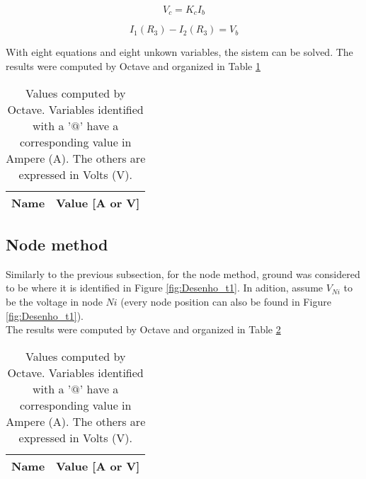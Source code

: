 \begin{equation}
	V_c = K_cI_b
	\label{eq:depsrc2}
\end{equation}

\begin{equation}
	I_1(R_3)-I_2(R_3) = V_b
	\label{eq:rel_ohm1}
\end{equation}

With eight equations and eight unkown variables, the sistem can be solved.
The results were computed by Octave and organized in Table \ref{tab:mesh}

\begin{table}[h]
	\centering
	\begin{tabular}{|l|r|}
    		\hline    
    		{\bf Name} & {\bf Value [A or V]} \\ \hline
    		
  	\end{tabular}
  	\caption{Values computed by Octave. Variables identified with a '$@$' have a
  	corresponding value in Ampere (A). The others are expressed in Volts (V).}
 
\label{tab:mesh}
\end{table}




\subsection{Node method}
\label{subsec:node_met}


Similarly to the previous subsection, for the node method, ground was considered to be where it is identified in
Figure \ref{fig:Desenho_t1}. In adition, assume $V_{Ni}$ to be the voltage in node $Ni$ (every node position can
also be found in Figure \ref{fig:Desenho_t1}). \\



The results were computed by Octave and organized in Table \ref{tab:node}

\begin{table}[h]
	\centering
	\begin{tabular}{|l|r|}
    		\hline    
    		{\bf Name} & {\bf Value [A or V]} \\ \hline
    		
  	\end{tabular}
  	\caption{Values computed by Octave. Variables identified with a '$@$' have a
  	corresponding value in Ampere (A). The others are expressed in Volts (V).}
 
\label{tab:node}
\end{table}


